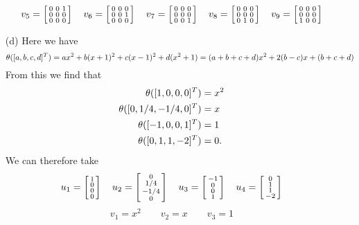 \begin{itemize}
   {\tiny \[
    v_5 = \left[\begin{smallmatrix} 0&0&1\\0&0&0\\0&0&0\end{smallmatrix}\right]\hspace{1em}
    v_6 = \left[\begin{smallmatrix} 0&0&0\\0&0&1\\0&0&0\end{smallmatrix}\right]\hspace{1em}
    v_7 = \left[\begin{smallmatrix} 0&0&0\\0&0&0\\0&0&1\end{smallmatrix}\right]\hspace{1em}
    v_8 = \left[\begin{smallmatrix} 0&0&0\\0&0&0\\0&1&0\end{smallmatrix}\right]\hspace{1em}
    v_9 = \left[\begin{smallmatrix} 0&0&0\\0&0&0\\1&0&0\end{smallmatrix}\right]
   \]}
  \item[(d)] Here we have
   \[ \theta([a,b,c,d]^T) = ax^2+b(x+1)^2+c(x-1)^2+d(x^2+1)
       = (a+b+c+d)x^2+2(b-c)x+(b+c+d)
   \]
   From this we find that
   \begin{align*}
    \theta([1,0,0,0]^T) &= x^2 \\
    \theta([0,1/4,-1/4,0]^T) &= x \\
    \theta([-1,0,0,1]^T) &= 1 \\
    \theta([0,1,1,-2]^T) &= 0.
   \end{align*}
   We can therefore take
   \[ u_1 = \left[\begin{smallmatrix} 1\\0\\0\\0 \end{smallmatrix}\right] \hspace{1em}
      u_2 = \left[\begin{smallmatrix} 0\\ 1/4 \\ -1/4 \\ 0 \end{smallmatrix}\right] \hspace{1em}
      u_3 = \left[\begin{smallmatrix} -1\\ 0 \\ 0 \\ 1 \end{smallmatrix}\right] \hspace{1em}
      u_4 = \left[\begin{smallmatrix} 0\\ 1\\ 1\\ -2 \end{smallmatrix}\right]
   \]
   \[ v_1 = x^2 \hspace{2em} v_2 = x \hspace{2em} v_3 = 1 \]
 \end{itemize}
\EndDeferredSolution

